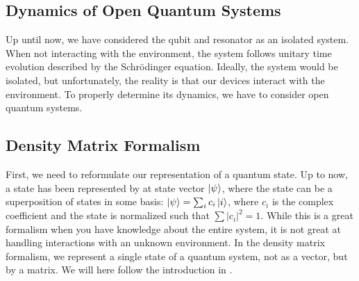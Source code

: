 \begin{fullwidth}
\chapter{Dynamics of Open Quantum Systems} \label{chap:open_quantum_systems}
\end{fullwidth}
Up until now, we have considered the qubit and resonator as an isolated system. When not interacting with the environment, the system follows unitary time evolution described by the Schrödinger equation. Ideally, the system would be isolated, but unfortunately, the reality is that our devices interact with the environment. To properly  determine its dynamics, we have to consider open quantum systems. \\


\section{Density Matrix Formalism}\label{sec:density_matrix_formalism}
First, we need to reformulate our representation of a quantum state. Up to now, a state has been represented by at state vector $\ket{\psi}$, where the state can be a superposition of states in some basis: $\ket{\psi} = \sum_i c_i\ket{i}$, where $c_i$ is the complex coefficient and the state is normalized such that $\sum |c_i|^2 = 1$. While this is a great formalism when you have knowledge about the entire system, it is not great at handling interactions with an unknown environment. In the density matrix formalism, we represent a single state of a quantum system, not as a vector, but by a matrix. We will here follow the introduction in \cite{manzano_short_2020}.

